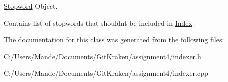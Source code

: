 \hyperlink{class_stopword}{Stopword} Object. 

Contains list of stopwords that shouldn\textquotesingle{}t be included in \hyperlink{class_index}{Index} 

The documentation for this class was generated from the following files\+:\begin{DoxyCompactItemize}
\item 
C\+:/\+Users/\+Mande/\+Documents/\+Git\+Kraken/assignment4/indexer.\+h\item 
C\+:/\+Users/\+Mande/\+Documents/\+Git\+Kraken/assignment4/indexer.\+cpp\end{DoxyCompactItemize}
